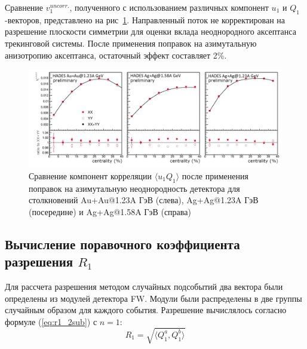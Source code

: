 Сравнение $v_1^{uncorr.}$, полученного с использованием различных компонент $u_1$ и $Q_1$-векторов, представлено на рис~\ref{fig:hades_uq_corr}. 
Направленный поток не корректирован на разрешение плоскости симметрии для оценки вклада неоднородного аксептанса трекинговой системы. 
После применения поправок на азимутальную анизотропию аксептанса, остаточный эффект составляет 2\%.
%
\begin{figure}[ht]
\begin{center}
\includegraphics[width=0.75\linewidth]{images/hades_u1W1_centrality.png}
\caption{Сравнение компонент корреляции $\langle u_1 Q_1 \rangle$ после применения поправок на азимутальную неоднородность детектора для столкновений Au+Au@1.23A ГэВ (слева), Ag+Ag@1.23A ГэВ (посередине) и Ag+Ag@1.58A ГэВ (справа)}
\label{fig:hades_uq_corr}
\end{center}
\end{figure}
%

\subsection{Вычисление поравочного коэффициента разрешения $R_1$}

Для рассчета разрешения методом случайных подсобытий два вектора были определены из модулей детектора FW.
Модули были распределены в две группы случайным образом для каждого события.
Разрешение вычислялось согласно формуле (\ref{eq:r1_2sub}) с $n=1$:
\begin{equation}
    R_1 = \sqrt{ \langle Q_1^a, Q_1^b \rangle  }
\end{equation}

